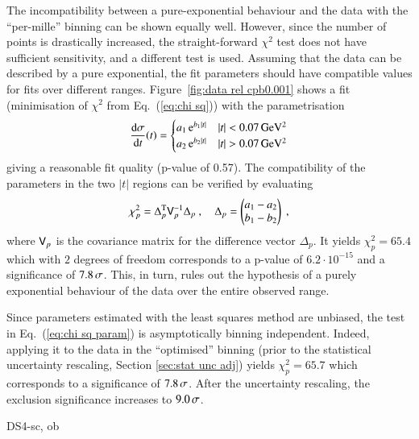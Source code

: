 The incompatibility between a pure-exponential behaviour and the data with the ``per-mille'' binning can be shown equally well. However, since the number of points is drastically increased, the straight-forward $\chi^2$ test does not have sufficient sensitivity, and a different test is used. Assuming that the data can be described by a pure exponential, the fit parameters should have compatible values for fits over different ranges. Figure~\ref{fig:data rel cpb0.001} shows a fit (minimisation of $\chi^2$ from Eq.~(\ref{eq:chi sq})) with the parametrisation
\begin{equation}
\label{eq:split fit param}
{{\rm d}\sigma\over{\rm d}t}(t) =
\begin{cases}
a_1\, {\rm e}^{b_1 |t|} & |t| < 0.07\,{\rm GeV^2}\\
a_2\, {\rm e}^{b_2 |t|} & |t| > 0.07\,{\rm GeV^2}\\
\end{cases}
\end{equation}
giving a reasonable fit quality (p-value of 0.57). The compatibility of the parameters in the two $|t|$ regions can be verified by evaluating
\begin{equation}
\label{eq:chi sq param}
\chi_p^2 = \Delta_p^{\rm T} \mathsf{V}_p^{-1} \Delta_p\ ,\quad \Delta_p =
\begin{pmatrix}
a_1 - a_2\\
b_1 - b_2\\
\end{pmatrix}\ ,
\end{equation}
where $\mathsf{V}_p$ is the covariance matrix for the difference vector $\Delta_p$. It yields $\chi_p^2 = 65.4$ which with $2$ degrees of freedom corresponds to a p-value of $6.2\cdot10^{-15}$ and a significance of $7.8\,{\rm \sigma}$. This, in turn, rules out the hypothesis of a purely exponential behaviour of the data over the entire observed range.

Since parameters estimated with the least squares method are unbiased, the test in Eq.~(\ref{eq:chi sq param}) is asymptotically binning independent. Indeed, applying it to the data in the ``optimised'' binning (prior to the statistical uncertainty rescaling, Section \ref{sec:stat unc adj}) yields $\chi^2_p = 65.7$ which corresponds to a significance of $7.8\,{\rm \sigma}$. After the uncertainty rescaling, the exclusion significance increases to $9.0\,{\rm \sigma}$.

\iffalse
DS4-sc, ob


